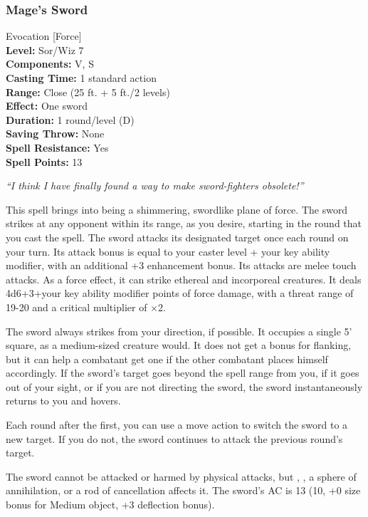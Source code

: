 \subsubsection{Mage's Sword}
\label{Spell:MagesSword}
Evocation [Force]
\\ \textbf{Level:} Sor/Wiz 7
\\ \textbf{Components:} V, S
\\ \textbf{Casting Time:} 1 standard action
\\ \textbf{Range:} Close (25 ft. + 5 ft./2 levels)
\\ \textbf{Effect:} One sword
\\ \textbf{Duration:} 1 round/level (D)
\\ \textbf{Saving Throw:} None
\\ \textbf{Spell Resistance:} Yes
\\ \textbf{Spell Points:} 13

\emph{``I think I have finally found a way to make sword-fighters obsolete!''}

This spell brings into being a shimmering, swordlike plane of force. 
The sword strikes at any opponent within its range, as you desire, starting in the round that you cast the spell. 
The sword attacks its designated target once each round on your turn. 
Its attack bonus is equal to your caster level + your key ability modifier, with an additional +3 enhancement bonus.
Its attacks are melee touch attacks.
As a force effect, it can strike ethereal and incorporeal creatures. 
It deals 4d6+3+your key ability modifier points of force damage, with a threat range of 19-20 and a critical multiplier of $\times$2.

The sword always strikes from your direction, if possible. It occupies a single 5' square, as a medium-sized creature would.
It does not get a bonus for flanking, but it can help a combatant get one if the other combatant places himself accordingly. 
If the sword's target goes beyond the spell range from you, if it goes out of your sight, 
or if you are not directing the sword, the sword instantaneously returns to you and hovers.

Each round after the first, you can use a move action to switch the sword to a new target. 
If you do not, the sword continues to attack the previous round's target.

The sword cannot be attacked or harmed by physical attacks, but , , a sphere of annihilation, or a rod of cancellation affects it. 
The sword's AC is 13 (10, +0 size bonus for Medium object, +3 deflection bonus).

